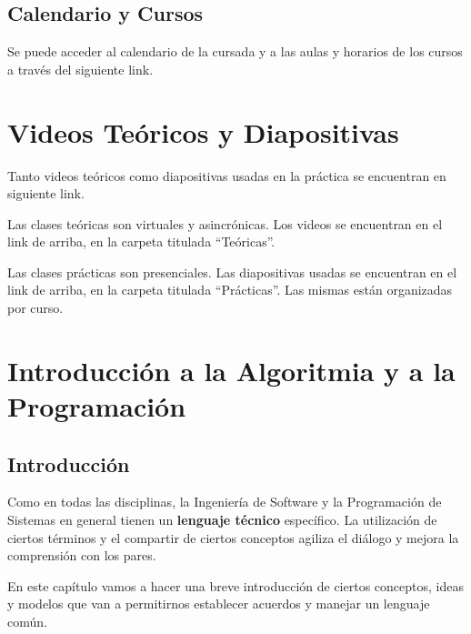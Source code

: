 \documentclass[
  letterpaper,
  DIV=11,
  numbers=noendperiod]{scrreprt}
\begin{document}
\section*{Calendario y Cursos}\label{calendario-y-cursos}


Se puede acceder al calendario de la cursada y a las aulas y horarios de
los cursos a través del siguiente link.


\chapter*{Videos Teóricos y
Diapositivas}\label{videos-teuxf3ricos-y-diapositivas}


Tanto videos teóricos como diapositivas usadas en la práctica se
encuentran en siguiente link.

Las clases teóricas son virtuales y asincrónicas. Los videos se
encuentran en el link de arriba, en la carpeta titulada ``Teóricas''.

Las clases prácticas son presenciales. Las diapositivas usadas se
encuentran en el link de arriba, en la carpeta titulada ``Prácticas''.
Las mismas están organizadas por curso.


\chapter{Introducción a la Algoritmia y a la
Programación}\label{introducciuxf3n-a-la-algoritmia-y-a-la-programaciuxf3n}

\section{Introducción}\label{introducciuxf3n}

Como en todas las disciplinas, la Ingeniería de Software y la
Programación de Sistemas en general tienen un \textbf{lenguaje técnico}
específico. La utilización de ciertos términos y el compartir de ciertos
conceptos agiliza el diálogo y mejora la comprensión con los pares.

En este capítulo vamos a hacer una breve introducción de ciertos
conceptos, ideas y modelos que van a permitirnos establecer acuerdos y
manejar un lenguaje común.
\end{document}
